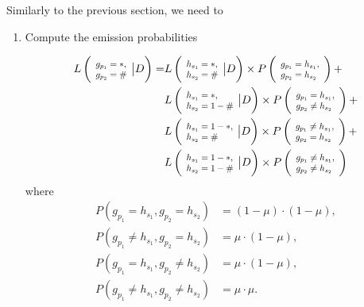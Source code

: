 \documentclass{bioinfo}
\newcommand*{\Scale}[2][4]{\scalebox{#1}{$#2$}}%
\begin{document}
Similarly to the previous section, we need to
\begin{enumerate}
\item Compute the emission probabilities

\begin{equation*}
\begin{split}
L\left( \Scale[0.8]{ \begin{array}{l} g_{p_1} = *, \\g_{p_2} = \# \end{array}} \big{|} D\right) = & L\left(\Scale[0.8]{\begin{array}{l}h_{s_1} = *,\\ h_{s_2} = \# \end{array}} \big{|} D \right) \times P\left(\Scale[0.8]{\begin{array}{l}g_{p_1} = h_{s_1}, \\g_{p_2}= h_{s_2}\end{array}} \right)  + \\
                                         & L\left(\Scale[0.8]{\begin{array}{l}h_{s_1} = *, \\h_{s_2} = 1-\# \end{array}} \big{|} D \right) \times P\left(\Scale[0.8]{\begin{array}{l}g_{p_1} = h_{s_1}, \\g_{p_2} \neq h_{s_2}\end{array}} \right)  + \\
                                         & L\left(\Scale[0.8]{\begin{array}{l}h_{s_1} = 1-*, \\h_{s_2} = \# \end{array}} \big{|} D \right) \times P\left(\Scale[0.8]{\begin{array}{l}g_{p_1} \neq h_{s_1}, \\g_{p_2} = h_{s_2}\end{array}} \right)  + \\
                                         & L\left(\Scale[0.8]{\begin{array}{l}h_{s_1} = 1-*, \\h_{s_2} = 1-\# \end{array}} \big{|} D \right) \times P\left(\Scale[0.8]{\begin{array}{l}g_{p_1} \neq h_{s_1}, \\g_{p_2} \neq h_{s_2}\end{array}} \right)
\end{split}\label{eqn:gp_given_D:two}
\end{equation*}
where
\begin{align*}
P(g_{p_1} = h_{s_1}, g_{p_2} = h_{s_2})       & = (1-\mu)\cdot(1-\mu) , \\
P(g_{p_1} \neq h_{s_1}, g_{p_2} = h_{s_2})    & = \mu\cdot(1-\mu),\\
P(g_{p_1} = h_{s_1}, g_{p_2} \neq h_{s_2})    & = \mu\cdot(1-\mu),\\
P(g_{p_1} \neq h_{s_1}, g_{p_2} \neq h_{s_2}) & = \mu \cdot \mu.
\end{align*}



\end{enumerate}
\end{document}
